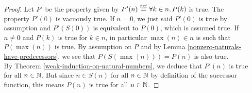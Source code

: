 \begin{proof}
    Let $P'$ be the property given by $P'(n) \overset{\mathrm{def}}{=} \forall k \in n, P(k)$ is true. The property $P'(0)$ is vacuously true. If $n = 0$, we just said $P'(0)$ is true by assumption and $P'(S(0))$ is equivalent to $P(0)$, which is assumed true. If $n \neq 0$ and $P(k)$ is true for $k \in n$, in particular $\max{(n)} \in n$ is such that $P(\max{(n)})$ is true. By assumption on $P$ and by Lemma \autoref{nonzero-naturals-have-predecessors}, we see that $P(S(\max{(n)})) = P(n)$ is also true.
    \\

    By Theorem \autoref{weak-induction-on-natural-numbers}, we deduce that $P'(n)$ is true for all $n \in \operatorname{\mathbb N}$. But since $n \in S(n)$ for all $n \in \operatorname{\mathbb N}$ by definition of the successor function, this means $P(n)$ is true for all $n \in \operatorname{\mathbb N}$. 
\end{proof}
